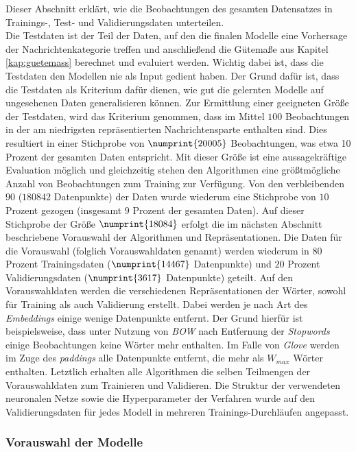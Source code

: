 \documentclass[a4paper,11pt]{article}
\begin{document}
Dieser Abschnitt erklärt, wie die  Beobachtungen des gesamten Datensatzes in Trainings-, Test- und Validierungsdaten unterteilen.\\
Die Testdaten ist der Teil der Daten, auf den die finalen Modelle eine Vorhersage der Nachrichtenkategorie treffen und anschließend die Gütemaße aus Kapitel \ref{kap:guetemass} berechnet und evaluiert werden. Wichtig dabei ist, dass die Testdaten den Modellen nie als Input gedient haben. Der Grund dafür ist, dass die Testdaten als Kriterium dafür dienen, wie gut die gelernten Modelle auf ungesehenen Daten generalisieren können. Zur Ermittlung einer geeigneten Größe der Testdaten, wird das Kriterium genommen, dass im Mittel $100$ Beobachtungen in der am niedrigsten repräsentierten Nachrichtensparte enthalten sind. Dies resultiert in einer Stichprobe von $\numprint{20005}$ Beobachtungen, was etwa 10 Prozent der gesamten Daten entspricht. 
Mit dieser Größe ist eine aussagekräftige Evaluation möglich und gleichzeitig stehen den Algorithmen eine größtmögliche Anzahl von Beobachtungen zum Training zur Verfügung. Von den verbleibenden $90$ ($180842$ Datenpunkte) der Daten wurde wiederum eine Stichprobe von $10$ Prozent gezogen (insgesamt $9$ Prozent der gesamten Daten). Auf dieser Stichprobe der Größe $\numprint{18084}$ erfolgt die im nächsten Abschnitt beschriebene Vorauswahl der Algorithmen und Repräsentationen. Die Daten für die Vorauswahl (folglich Vorauswahldaten genannt) werden wiederum in $80$ Prozent Trainingsdaten ($\numprint{14467}$ Datenpunkte) und $20$ Prozent  Validierungsdaten ($\numprint{3617}$ Datenpunkte) geteilt. Auf den Vorauswahldaten werden die verschiedenen Repräsentationen der Wörter, sowohl für Training als auch Validierung erstellt. Dabei werden je nach Art des \textit{Embeddings} einige wenige Datenpunkte entfernt. Der Grund hierfür ist beispielsweise, dass  unter Nutzung von \textit{BOW} nach Entfernung der \textit{Stopwords} einige Beobachtungen keine Wörter mehr enthalten. Im Falle von \textit{Glove} werden im Zuge des \textit{paddings} alle Datenpunkte entfernt, die mehr als $W_{max}$ Wörter enthalten.
Letztlich erhalten alle Algorithmen die selben Teilmengen der Vorauswahldaten zum Trainieren und Validieren. Die Struktur der verwendeten neuronalen Netze sowie die Hyperparameter der Verfahren wurde auf den Validierungsdaten für jedes Modell in mehreren Trainings-Durchläufen angepasst.

\subsubsection{Vorauswahl der Modelle}\label{kap:preselection}
\end{document}
